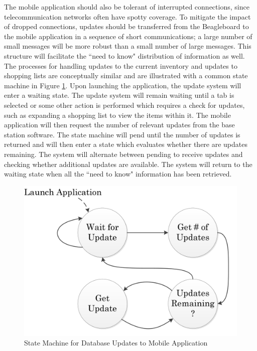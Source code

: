 \documentclass[11pt]{article} %
\begin{document}
\newline \quad \newline
The mobile application should also be tolerant of interrupted connections, since telecommunication networks often have spotty coverage. To mitigate the impact of dropped connections, updates should be transferred from the Beagleboard to the mobile application in a sequence of short communications; a large number of small messages will be more robust than a small number of large messages. This structure will facilitate the ``need to know" distribution of information as well. The processes for handling updates to the current inventory and updates to shopping lists are conceptually similar and are illustrated with a common state machine in Figure \ref{fig:state}. Upon launching the application, the update system will enter a waiting state. The update system will remain waiting until a tab is selected or some other action is performed which requires a check for updates, such as expanding a shopping list to view the items within it. The mobile application will  then request the number of relevant updates from the base station software. The state machine will pend until the number of updates is returned and will then enter a state which evaluates whether there are updates remaining. The system will alternate between pending to receive updates and checking whether additional updates are available. The system will return to the waiting state when all the ``need to know" information has been retrieved.
\begin{figure}[h!]
\vspace{0.5cm}
\begin{center}
\includegraphics[scale=0.8]{../Graphics/StateMachine}
\caption{State Machine for Database Updates to Mobile Application}
\label{fig:state}
\end{center}
\end{figure}
\end{document}
